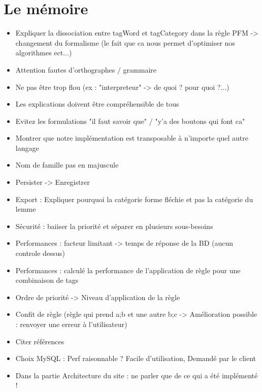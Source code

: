 \documentclass{article}
\begin{document}
\section{Le mémoire}
\begin{itemize}
    \item Expliquer la dissociation entre tagWord et tagCategory dans la règle PFM -> changement du formalisme (le fait que ca nous permet d'optimiser nos algorithmes ect...)
    \item Attention fautes d'orthographes / grammaire
    \item Ne pas être trop flou (ex : "interpreteur" -> de quoi ? pour quoi ?...)
    \item Les explications doivent être compréhensible de tous
    \item Evitez les formulations "il faut savoir que" / "y'a des boutons qui font ca"
    \item Montrer que notre implémentation est transposable à n'importe quel autre langage
    \item Nom de famille pas en majuscule
    \item Persister -> Enregistrer
    \item Export : Expliquer pourquoi la catégorie forme fléchie et pas la catégorie du lemme
    \item Sécurité : baiiser la priorité et séparer en plusieurs sous-besoins
    \item Performances : facteur limitant -> temps de réponse de la BD (aucun controle dessus)
    \item Performances : calculé la performance de l'application de règle pour une combinaison de tags
    \item Ordre de priorité -> Niveau d'application de la règle
    \item Confit de règle (règle qui prend a;b et une autre b;c -> Amélioration possible : renvoyer une erreur à l'utilisateur)
    \item Citer références
    \item Choix MySQL : Perf raisonnable ? Facile d'utilisation, Demandé par le client
    \item Dans la partie Architecture du site : ne parler que de ce qui a été implémenté !
\end{itemize}
\end{document}
